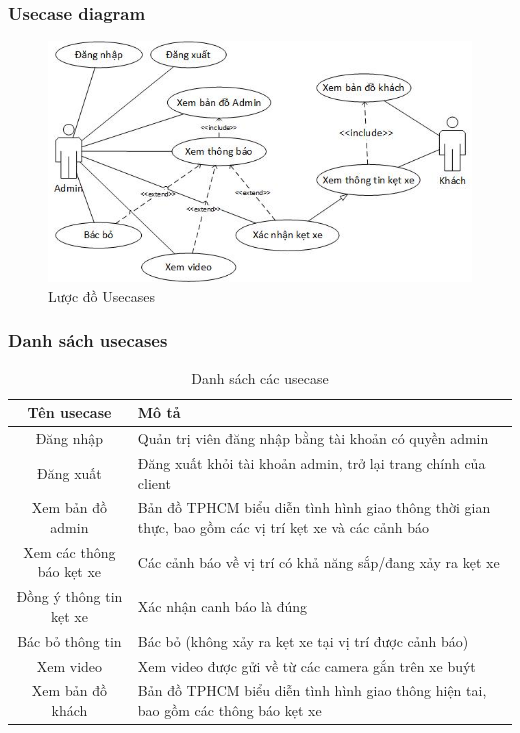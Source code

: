 	\subsubsection{Usecase diagram}
		\begin{center}
			\begin{figure}[H]
				\centering
					\includegraphics[scale=.75]{Graphics/usecase}
					\caption{Lược đồ Usecases}
			\end{figure}
		\end{center}

	\subsubsection{Danh sách usecases}
	
	\begin{table}[H]
		\centering
		\begin{tabularx}{\textwidth}{|c|>{\raggedright\arraybackslash}X |}
			\hline
			Tên usecase	& Mô tả\\
			\hline
			Đăng nhập&
			Quản trị viên đăng nhập bằng tài khoản có quyền admin	\\
			\hline	
			Đăng xuất	&									Đăng xuất khỏi tài khoản admin, trở lại trang chính của client\\\hline																				
			Xem bản đồ admin &										Bản đồ TPHCM biểu diễn tình hình giao thông thời gian thực, bao gồm các vị trí kẹt xe và các cảnh báo \\\hline																				
			Xem các thông báo kẹt xe&										Các cảnh báo về vị trí có khả năng sắp/đang xảy ra kẹt xe\\\hline																				
			Đồng ý thông tin kẹt xe&										Xác nhận canh báo là đúng\\\hline		
			Bác bỏ thông tin&										Bác bỏ (không xảy ra kẹt xe tại vị trí được cảnh báo)\\\hline																				
			Xem video&										Xem video được gửi về từ các camera gắn trên xe buýt\\\hline																				
			Xem bản đồ khách&										Bản đồ TPHCM biểu diễn tình hình giao thông hiện tai, bao gồm các thông báo kẹt xe\\
			\hline
			\end{tabularx}
		\caption{Danh sách các usecase}
	\end{table}
